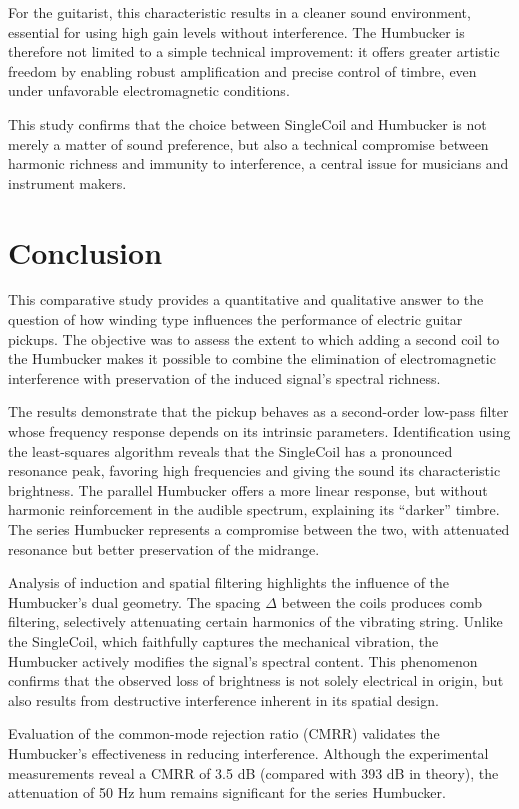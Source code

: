 \documentclass[11pt, a4paper]{article}
\begin{document}
For the guitarist, this characteristic results in a cleaner sound environment, essential for using high gain levels without interference. The Humbucker is therefore not limited to a simple technical improvement: it offers greater artistic freedom by enabling robust amplification and precise control of timbre, even under unfavorable electromagnetic conditions.

This study confirms that the choice between SingleCoil and Humbucker is not merely a matter of sound preference, but also a technical compromise between harmonic richness and immunity to interference, a central issue for musicians and instrument makers.

\newpage
\section{Conclusion}
This comparative study provides a quantitative and qualitative answer to the question of how winding type influences the performance of electric guitar pickups. The objective was to assess the extent to which adding a second coil to the Humbucker makes it possible to combine the elimination of electromagnetic interference with preservation of the induced signal's spectral richness.

The results demonstrate that the pickup behaves as a second-order low-pass filter whose frequency response depends on its intrinsic parameters. Identification using the least-squares algorithm reveals that the SingleCoil has a pronounced resonance peak, favoring high frequencies and giving the sound its characteristic brightness. The parallel Humbucker offers a more linear response, but without harmonic reinforcement in the audible spectrum, explaining its ``darker'' timbre. The series Humbucker represents a compromise between the two, with attenuated resonance but better preservation of the midrange.

Analysis of induction and spatial filtering highlights the influence of the Humbucker's dual geometry. The spacing $\Delta$ between the coils produces comb filtering, selectively attenuating certain harmonics of the vibrating string. Unlike the SingleCoil, which faithfully captures the mechanical vibration, the Humbucker actively modifies the signal's spectral content. This phenomenon confirms that the observed loss of brightness is not solely electrical in origin, but also results from destructive interference inherent in its spatial design.

Evaluation of the common-mode rejection ratio (CMRR) validates the Humbucker's effectiveness in reducing interference. Although the experimental measurements reveal a CMRR of 3.5 dB (compared with 393 dB in theory), the attenuation of 50 Hz hum remains significant for the series Humbucker.
\end{document}
